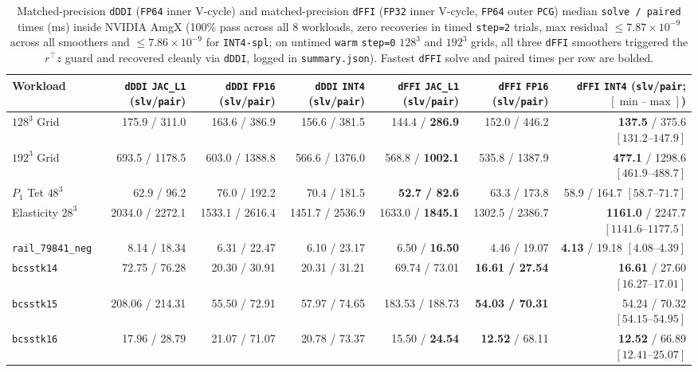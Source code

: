 \documentclass[10pt]{article}
\begin{document}
\begin{table}[t]
\centering\scriptsize
\begin{tabular}{@{}lrrrrrr@{}}
\toprule
Workload & \texttt{dDDI} \texttt{JAC\_L1} (\texttt{slv}/\texttt{pair}) & \texttt{dDDI} \texttt{FP16} (\texttt{slv}/\texttt{pair}) & \texttt{dDDI} \texttt{INT4} (\texttt{slv}/\texttt{pair}) & \texttt{dFFI} \texttt{JAC\_L1} (\texttt{slv}/\texttt{pair}) & \texttt{dFFI} \texttt{FP16} (\texttt{slv}/\texttt{pair}) & \texttt{dFFI} \texttt{INT4} (\texttt{slv}/\texttt{pair}; $[\min\text{--}\max]$) \\
\midrule
$128^3$ Grid & 175.9 / 311.0 & 163.6 / 386.9 & 156.6 / 381.5 & 144.4 / \textbf{286.9} & 152.0 / 446.2 & \textbf{137.5} / 375.6 $[131.2\text{--}147.9]$ \\
$192^3$ Grid & 693.5 / 1178.5 & 603.0 / 1388.8 & 566.6 / 1376.0 & 568.8 / \textbf{1002.1} & 535.8 / 1387.9 & \textbf{477.1} / 1298.6 $[461.9\text{--}488.7]$ \\
$P_1$ Tet $48^3$ & 62.9 / 96.2 & 76.0 / 192.2 & 70.4 / 181.5 & \textbf{52.7 / 82.6} & 63.3 / 173.8 & 58.9 / 164.7 $[58.7\text{--}71.7]$ \\
Elasticity $28^3$ & 2034.0 / 2272.1 & 1533.1 / 2616.4 & 1451.7 / 2536.9 & 1633.0 / \textbf{1845.1} & 1302.5 / 2386.7 & \textbf{1161.0} / 2247.7 $[1141.6\text{--}1177.5]$ \\
\texttt{rail\_79841\_neg} & 8.14 / 18.34 & 6.31 / 22.47 & 6.10 / 23.17 & 6.50 / \textbf{16.50} & 4.46 / 19.07 & \textbf{4.13} / 19.18 $[4.08\text{--}4.39]$ \\
\texttt{bcsstk14} & 72.75 / 76.28 & 20.30 / 30.91 & 20.31 / 31.21 & 69.74 / 73.01 & \textbf{16.61 / 27.54} & \textbf{16.61} / 27.60 $[16.27\text{--}17.01]$ \\
\texttt{bcsstk15} & 208.06 / 214.31 & 55.50 / 72.91 & 57.97 / 74.65 & 183.53 / 188.73 & \textbf{54.03 / 70.31} & 54.24 / 70.32 $[54.15\text{--}54.95]$ \\
\texttt{bcsstk16} & 17.96 / 28.79 & 21.07 / 71.07 & 20.78 / 73.37 & 15.50 / \textbf{24.54} & \textbf{12.52} / 68.11 & \textbf{12.52} / 66.89 $[12.41\text{--}25.07]$ \\
\bottomrule
\end{tabular}
\caption{Matched-precision \texttt{dDDI} (\texttt{FP64} inner V-cycle) and matched-precision \texttt{dFFI} (\texttt{FP32} inner V-cycle, \texttt{FP64} outer \texttt{PCG}) median \texttt{solve / paired} times (ms) inside NVIDIA AmgX (100\% pass across all 8 workloads, zero recoveries in timed \texttt{step=2} trials, max residual $\le 7.87\times 10^{-9}$ across all smoothers and $\le 7.86\times 10^{-9}$ for \texttt{INT4-spl}; on untimed \texttt{warm} \texttt{step=0} $128^3$ and $192^3$ grids, all three \texttt{dFFI} smoothers triggered the $r^\top z$ guard and recovered cleanly via \texttt{dDDI}, logged in \texttt{summary.json}). Fastest \texttt{dFFI} solve and paired times per row are bolded.}
\label{tab:paired}
\end{table}
\end{document}
